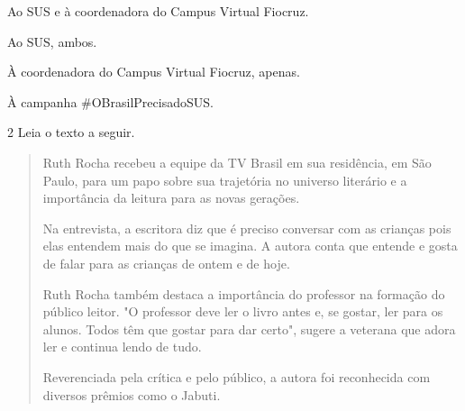\begin{escolha}
\item Ao SUS e à coordenadora do Campus Virtual Fiocruz.
\item Ao SUS, ambos.
\item À coordenadora do Campus Virtual Fiocruz, apenas.
\item À campanha \#OBrasilPrecisadoSUS.
\end{escolha}



\num{2} Leia o texto a seguir.

\begin{quote}
\noindent Ruth Rocha recebeu a equipe da TV Brasil em sua residência, em São
Paulo, para um papo sobre sua trajetória no universo literário e a
importância da leitura para as novas gerações.

Na entrevista, a escritora diz que é preciso conversar com as crianças
pois elas entendem mais do que se imagina. A autora conta que entende e
gosta de falar para as crianças de ontem e de hoje.

Ruth Rocha também destaca a importância do professor na formação do
público leitor. "O professor deve ler o livro antes e, se gostar, ler
para os alunos. Todos têm que gostar para dar certo", sugere a veterana
que adora ler e continua lendo de tudo.

Reverenciada pela crítica e pelo público, a autora foi reconhecida com
diversos prêmios como o Jabuti.

\end{quote}

